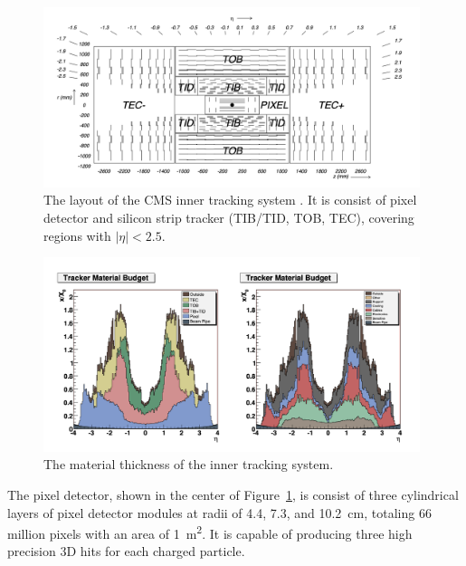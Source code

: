 \begin{figure}[ht]
    \centering
    \includegraphics[width=0.98\textwidth]{chapters/CMSExperiment/sectionDetector/figures/tracker.png}
    \caption{The layout of the CMS inner tracking system \cite{exhep:cms:Chatrchyan:2008aa}. It is consist of pixel detector and silicon strip tracker (TIB/TID, TOB, TEC), covering regions with $|\eta|<2.5$. }
    \label{fig:cmsexperiment:detector:tracker}
\end{figure}


\begin{figure}[ht]
    \centering
    \includegraphics[width=0.98\textwidth]{chapters/CMSExperiment/sectionDetector/figures/trackerMaterial.png}
    \caption{The material thickness of the inner tracking system.}
    \label{fig:cmsexperiment:detector:trackerMaterial}
\end{figure}




The pixel detector, shown in the center of Figure~\ref{fig:cmsexperiment:detector:tracker}, is consist of three cylindrical layers of pixel detector modules at radii of 4.4, 7.3, and 10.2~cm, totaling 66 million pixels with an area of 1~\si{\m \squared}. It is capable of producing three high precision 3D hits for each charged particle. 

